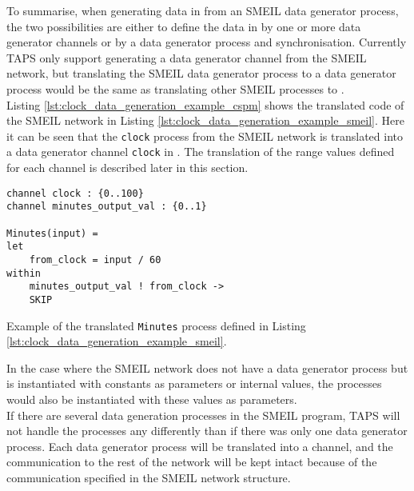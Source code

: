 To summarise, when generating data in \cspm{} from an SMEIL data generator process, the two possibilities are either to define the data in \cspm{} by one or more data generator channels or by a data generator process and synchronisation.
Currently TAPS only support generating a data generator channel from the SMEIL network, but translating the SMEIL data generator process to a \cspm{} data generator process would be the same as translating other SMEIL processes to \cspm{}.\\

Listing \ref{lst:clock_data_generation_example_cspm} shows the translated code of the SMEIL network in Listing \ref{lst:clock_data_generation_example_smeil}. Here it can be seen that the \texttt{clock} process from the SMEIL network is translated into a data generator channel \texttt{clock} in \cspm{}. The translation of the range values defined for each channel is described later in this section.
\begin{listing}
\begin{verbatim}
channel clock : {0..100}
channel minutes_output_val : {0..1}

Minutes(input) =
let
    from_clock = input / 60
within
    minutes_output_val ! from_clock ->
    SKIP

\end{verbatim}
\caption{Example of the translated \texttt{Minutes} process defined in Listing \ref{lst:clock_data_generation_example_smeil}.}
\label{lst:clock_data_generation_example_cspm}
\end{listing}
In the case where the SMEIL network does not have a data generator process but is instantiated with constants as parameters or internal values, the \cspm{} processes would also be instantiated with these values as parameters.\\

If there are several data generation processes in the SMEIL program, TAPS will not handle the processes any differently than if there was only one data generator process. Each data generator process will be translated into a \cspm{} channel, and the communication to the rest of the network will be kept intact because of the communication specified in the SMEIL network structure.


